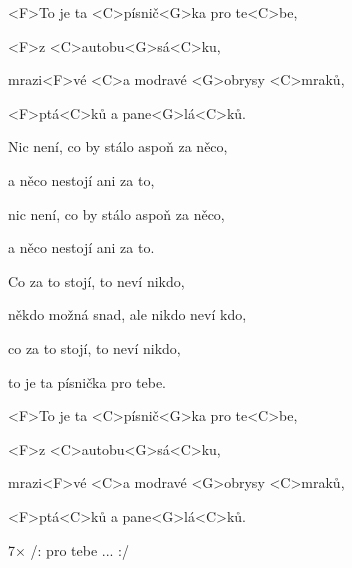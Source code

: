 

\zs
<F>To je ta <C>písnič<G>ka pro te<C>be,

<F>z <C>autobu<G>sá<C>ku,

mrazi<F>vé <C>a modravé <G>obrysy <C>mraků,

<F>ptá<C>ků a pane<G>lá<C>ků.
\ks

\zs
Nic není, co by stálo aspoň za něco,

a něco nestojí ani za to,

nic není, co by stálo aspoň za něco,

a něco nestojí ani za to.
\ks

\zs
Co za to stojí, to neví nikdo,

někdo možná snad, ale nikdo neví kdo,

co za to stojí, to neví nikdo,

to je ta písnička pro tebe.
\ks

\zs
<F>To je ta <C>písnič<G>ka pro te<C>be,

<F>z <C>autobu<G>sá<C>ku,

mrazi<F>vé <C>a modravé <G>obrysy <C>mraků,

<F>ptá<C>ků a pane<G>lá<C>ků.
\ks

7× /: pro tebe ... :/

\kp






















